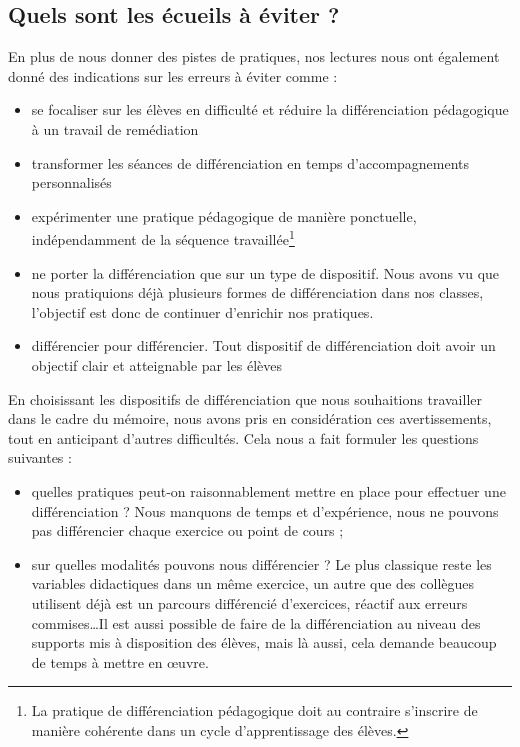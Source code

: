 \subsection{Quels sont les écueils à éviter ?}
En plus de nous donner des pistes de pratiques, nos lectures nous ont également donné des indications sur les erreurs à éviter comme :
\begin{itemize}
	\item se focaliser sur les élèves en difficulté et réduire la différenciation pédagogique à un travail de remédiation\cite{Eduscol}\cite{renc_pedago}
	\item transformer les séances de différenciation en temps d'accompagnements personnalisés\cite{Eduscol}
	\item expérimenter une pratique pédagogique de manière ponctuelle, indépendamment de la séquence travaillée\cite{renc_pedago}\footnote{La pratique de différenciation pédagogique doit au contraire s'inscrire de manière cohérente dans un cycle d'apprentissage des élèves.}
	\item ne porter la différenciation que sur un type de dispositif. Nous avons vu que nous pratiquions déjà plusieurs formes de différenciation dans nos classes, l'objectif est donc de continuer d'enrichir nos pratiques.
	\item différencier pour différencier. Tout dispositif de différenciation doit avoir un objectif clair et atteignable par les élèves\cite{Eduscol}\cite{Meirieu_différenciation}\cite{cnesco_notes_experts}
\end{itemize}
En choisissant les dispositifs de différenciation que nous souhaitions travailler dans le cadre du mémoire, nous avons pris en considération ces avertissements, tout en anticipant d'autres difficultés. Cela nous a fait formuler les questions suivantes :
\begin{itemize}
	\item quelles pratiques peut-on raisonnablement mettre en place pour effectuer une différenciation ? Nous manquons de temps et d’expérience, nous ne pouvons pas différencier chaque exercice ou point de cours ;
	\item sur quelles modalités pouvons nous différencier ? Le plus classique reste les variables didactiques dans un même exercice, un autre que des collègues utilisent déjà est un parcours différencié d’exercices, réactif aux erreurs commises\ldots Il est aussi possible de faire de la différenciation au niveau des supports mis à disposition des élèves, mais là aussi, cela demande beaucoup de temps à mettre en \oe{}uvre.
\end{itemize}


